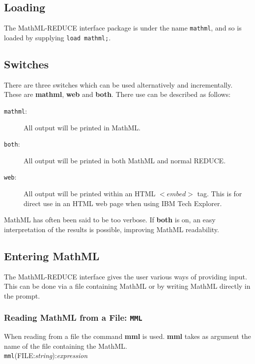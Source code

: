 \documentclass{article}
\begin{document}
\subsection{Loading}

The MathML-REDUCE interface package is under the name {\tt mathml}, and so is
loaded by supplying {\tt load mathml;}.

\subsection{Switches}

There are three switches which can be used alternatively and
incrementally.  These are {\bf mathml}, {\bf web} and {\bf both}. There
use can be described as follows:

\begin{description}
\item[{\tt mathml}:] All output will be printed in MathML.
\item[{\tt both}:] All output will be printed in both MathML and normal
REDUCE.

\item[{\tt web}:] All output will be printed within an HTML $<embed>$ tag. 
This is for direct use in an HTML web page when using IBM Tech Explorer.
\end{description}

MathML has often been said to be too verbose. If {\bf both} is on, an easy
interpretation of the results is possible, improving MathML readability.

\subsection{Entering MathML}

The MathML-REDUCE interface gives the user various ways of providing
input. This can be done via a file containing MathML or by writing MathML
directly in the prompt. \\

\subsubsection{Reading MathML from a File: {\tt MML}}

When reading from a file the command {\bf mml} is used. {\bf mml} takes as
argument the name of the file containing the MathML. \\

{\tt mml}(FILE:{\it string}):{\it expression} 
\end{document}
